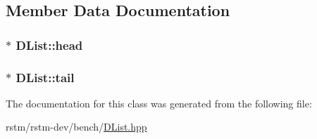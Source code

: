 \subsection{Member Data Documentation}
\hypertarget{classDList_a1eba8e33defbea1bb370d26b6ec26ffa}{
\subsubsection[{head}]{$\ast$ D\-List\-::head}}\label{classDList_a1eba8e33defbea1bb370d26b6ec26ffa}
\hypertarget{classDList_a49eb783a98d63873114836968b18a94c}{
\subsubsection[{tail}]{$\ast$ D\-List\-::tail}}\label{classDList_a49eb783a98d63873114836968b18a94c}


The documentation for this class was generated from the following file\-:\begin{DoxyCompactItemize}
\item 
rstm/rstm-\/dev/bench/\hyperlink{DList_8hpp}{D\-List.\-hpp}\end{DoxyCompactItemize}
